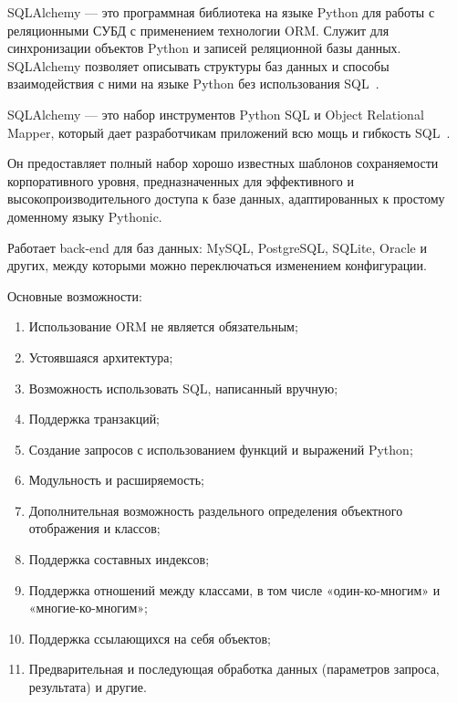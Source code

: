 \documentclass{altsu-report}
\begin{document}
SQLAlchemy --- это программная библиотека на языке Python для работы с реляционными СУБД с применением технологии ORM. Служит для синхронизации объектов Python и записей реляционной базы данных. SQLAlchemy позволяет описывать структуры баз данных и способы взаимодействия с ними на языке Python без использования SQL~\cite{SQL_wiki}.

SQLAlchemy --- это набор инструментов Python SQL и Object Relational Mapper, который дает разработчикам приложений всю мощь и гибкость SQL~\cite{SQL}.

Он предоставляет полный набор хорошо известных шаблонов сохраняемости корпоративного уровня, предназначенных для эффективного и высокопроизводительного доступа к базе данных, адаптированных к простому доменному языку Pythonic.

Работает back-end для баз данных: MySQL, PostgreSQL, SQLite, Oracle и других, между которыми можно переключаться изменением конфигурации.

Основные возможности:

\begin{enumerate}
    \item Использование ORM не является обязательным;

    \item Устоявшаяся архитектура;

    \item Возможность использовать SQL, написанный вручную;

    \item Поддержка транзакций;

    \item Создание запросов с использованием функций и выражений Python;

    \item Модульность и расширяемость;

    \item Дополнительная возможность раздельного определения объектного отображения и классов;

    \item Поддержка составных индексов;

    \item Поддержка отношений между классами, в том числе «один-ко-многим» и «многие-ко-многим»;

    \item Поддержка ссылающихся на себя объектов;

    \item Предварительная и последующая обработка данных (параметров запроса, результата) и другие.
\end{enumerate}
\end{document}
